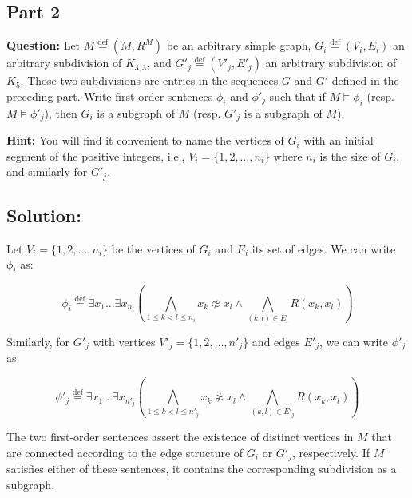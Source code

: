 \documentclass{article}
\begin{document}
\newpage

\subsection*{Part 2}


\vspace{1em}
\begin{mdframed}
    \textbf{Question:} Let $M \stackrel{\text{def}}{=} (M, R^M)$ be an arbitrary simple graph, $G_i \stackrel{\text{def}}{=} (V_i, E_i)$ an arbitrary subdivision of $K_{3,3}$, and $G'_j \stackrel{\text{def}}{=} (V'_j, E'_j)$ an arbitrary subdivision of $K_5$. Those two subdivisions are entries in the sequences $G$ and $G'$ defined in the preceding part. Write first-order sentences $\phi_i$ and $\phi'_j$ such that if $M \models \phi_i$ (resp. $M \models \phi'_j$), then $G_i$ is a subgraph of $M$ (resp. $G'_j$ is a subgraph of $M$).

    \vspace{1em}
    \textbf{Hint:} You will find it convenient to name the vertices of $G_i$ with an initial segment of the positive integers, i.e., $V_i = \{1, 2, \ldots, n_i\}$ where $n_i$ is the size of $G_i$, and similarly for $G'_j$.
    
\end{mdframed}

\subsection*{Solution:}

Let $V_i = \{1, 2, \ldots, n_i\}$ be the vertices of $G_i$ and $E_i$ its set of edges. We can write $\phi_i$ as:

\[
\phi_i \stackrel{\text{def}}{=} \exists x_1 \ldots \exists x_{n_i} \left(
    \bigwedge_{1 \leq k < l \leq n_i} x_k \not\approx x_l \land
    \bigwedge_{(k,l) \in E_i} R(x_k, x_l)
\right)
\]

Similarly, for $G'_j$ with vertices $V'_j = \{1, 2, \ldots, n'_j\}$ and edges $E'_j$, we can write $\phi'_j$ as:

\[
\phi'_j \stackrel{\text{def}}{=} \exists x_1 \ldots \exists x_{n'_j} \left(
    \bigwedge_{1 \leq k < l \leq n'_j} x_k \not\approx x_l \land
    \bigwedge_{(k,l) \in E'_j} R(x_k, x_l)
\right)
\]

The two first-order sentences assert the existence of distinct vertices in $M$ that are connected according to the edge structure of $G_i$ or $G'_j$, respectively. If $M$ satisfies either of these sentences, it contains the corresponding subdivision as a subgraph.
\end{document}
